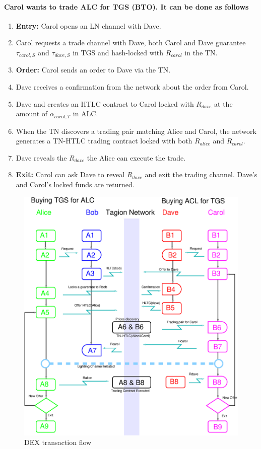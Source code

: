 \paragraph{Carol wants to trade ALC for TGS (BTO). It can be done as follows}
\begin{enumerate}[{B}.1]
 \item \textbf{Entry:} Carol opens an LN channel with Dave.
 \item Carol requests a trade channel with Dave, both Carol and Dave guarantee $\tau_{carol,S}$ and $\tau_{dave,S}$ in TGS and hash-locked with $R_{carol}$ in the TN.
 \item \textbf{Order:} Carol sends an order to Dave via the TN.
 \item Dave receives a confirmation from the network about the order from Carol.  
 \item Dave and creates an HTLC contract to Carol locked with $R_{dave}$ at the amount of $\alpha_{carol,T}$ in ALC.
 \item When the TN discovers a trading pair matching Alice and Carol, the network generates a TN-HTLC trading contract locked with both $R_{alice}$ and $R_{carol}$.
 \item Dave reveals the $R_{dave}$ the Alice can execute the trade.
 \item \textbf{Exit:} Carol can ask Dave to reveal $R_{dave}$ and exit the trading channel. Dave's and Carol's locked funds are returned.  
 
\end{enumerate}

\begin{figure}[H]
 \centering
 \includegraphics[width=1.0\textwidth]{fig/dex_flow.eps}
 \caption{DEX transaction flow}
 \label{fig:dex_flow}
\end{figure}

